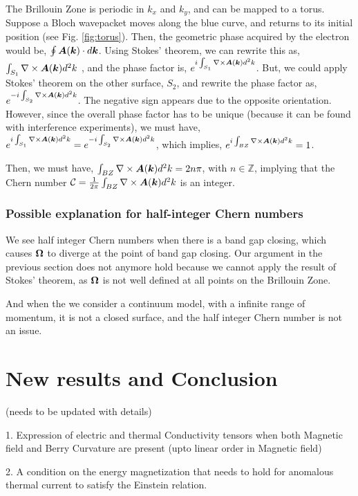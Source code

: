 \documentclass{report}
\renewcommand\vec[1]{\ensuremath\boldsymbol{#1}} %
\begin{document}
The Brillouin Zone is periodic in $k_x$ and $k_y$, and can be mapped to a torus. Suppose a Bloch wavepacket moves along the blue curve, and returns to its initial position (see Fig. \ref{fig:torus}). Then, the geometric phase acquired by the electron would be, $\oint \vec{A}(\vec{k})\cdot d\vec{k}$. Using Stokes' theorem, we can rewrite this as, $\int_{S_1} \nabla \times \vec{A}(\vec{k}) d^2 k$ , and the phase factor is, $e^{i\int_{S_1} \nabla \times \vec{A}(\vec{k}) d^2 k}$. But, we could apply Stokes' theorem on the other surface, $S_2$, and rewrite the phase factor as, $e^{-i\int_{S_2} \nabla \times \vec{A}(\vec{k}) d^2 k}$. The negative sign appears due to the opposite orientation.
However, since the overall phase factor has to be unique (because it can be found with interference experiments), we must have, $e^{i\int_{S_1} \nabla \times \vec{A}(\vec{k}) d^2 k} = e^{-i\int_{S_2} \nabla \times \vec{A}(\vec{k}) d^2 k}$, which implies, $e^{i\int_{B Z} \nabla \times \vec{A}(\vec{k}) d^2 k} = 1$.

Then, we must have, $\int_{B Z} \nabla \times \vec{A}(\vec{k}) d^2 k = 2 n \pi$, with $n \in \mathbb{Z}$, implying that the Chern number $\mathcal{C}=\frac{1}{2\pi} \int_{B Z} \nabla \times \vec{A}(\vec{k}) d^2 k$ is an integer.

\subsection{Possible explanation for half-integer Chern numbers}
We see half integer Chern numbers when there is a band gap closing, which causes $\vec{\Omega}$ to diverge at the point of band gap closing. Our argument in the previous section does not anymore hold because we cannot apply the result of Stokes' theorem, as $\vec{\Omega}$ is not well defined at all points on the Brillouin Zone.

And when the we consider a continuum model, with a infinite range of momentum, it is not a closed surface, and the half integer Chern number is not an issue. 


\chapter{New results and Conclusion}
(needs to be updated with details)

1. Expression of electric and thermal Conductivity tensors when both Magnetic field and Berry Curvature are present (upto linear order in Magnetic field)

2. A condition on the energy magnetization that needs to hold for anomalous thermal current to satisfy the Einstein relation.
\end{document}
